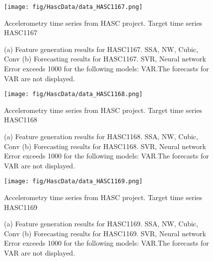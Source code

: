 \documentclass[12pt]{article}
\begin{document}
\begin{figure}
\centering
\texttt{[image: fig/HascData/data\_HASC1167.png]}
\caption{Accelerometry time series from HASC project. Target time series	HASC1167	}
\end{figure}


\begin{figure}
\centering
{}
\caption{(a)	Feature generation results for	HASC1167.	SSA, NW, Cubic, Conv	(b)	Forecasting results for	HASC1167.	SVR, Neural network	Error exceeds 1000 for the following models: VAR.The forecasts for VAR are not displayed.	}
\end{figure}


\begin{figure}
\centering
\texttt{[image: fig/HascData/data\_HASC1168.png]}
\caption{Accelerometry time series from HASC project. Target time series	HASC1168	}
\end{figure}


\begin{figure}
\centering
{}
\caption{(a)	Feature generation results for	HASC1168.	SSA, NW, Cubic, Conv	(b)	Forecasting results for	HASC1168.	SVR, Neural network	Error exceeds 1000 for the following models: VAR.The forecasts for VAR are not displayed.	}
\end{figure}


\begin{figure}
\centering
\texttt{[image: fig/HascData/data\_HASC1169.png]}
\caption{Accelerometry time series from HASC project. Target time series	HASC1169	}
\end{figure}


\begin{figure}
\centering
{}
\caption{(a)	Feature generation results for	HASC1169.	SSA, NW, Cubic, Conv	(b)	Forecasting results for	HASC1169.	SVR, Neural network	Error exceeds 1000 for the following models: VAR.The forecasts for VAR are not displayed.	}
\end{figure}
\end{document}

